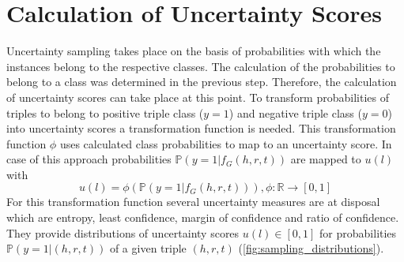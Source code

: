\section{Calculation of Uncertainty Scores}
\label{sec:calculation_of_uncertainty_scores}
%
Uncertainty sampling takes place on the basis of probabilities with which the instances belong to the respective classes.
The calculation of the probabilities to belong to a class was determined in the previous step.
Therefore, the calculation of uncertainty scores can take place at this point.
%
To transform probabilities of triples to belong to positive triple class ($y = 1$) and negative triple class ($y = 0$) into uncertainty scores a transformation function is needed.
This transformation function $\phi$ uses calculated class probabilities to map to an uncertainty score.
In case of this approach probabilities $\mathds{P}(y = 1| f_G(h, r, t))$ are  mapped to $u(l)$ with 
\begin{equation} \label{eqn:uncertainty_function}
    u(l) = \phi(\mathds{P}(y = 1| f_G(h, r, t))), \phi: \mathbb{R} \rightarrow [0,1]
\end{equation}
For this transformation function several uncertainty measures are at disposal which are entropy, least confidence, margin of confidence and ratio of confidence.
They provide distributions of uncertainty scores $u(l) \in [0, 1]$ for probabilities $\mathbb{P}(y = 1 | (h,r,t))$ of a given triple $(h, r, t)$ (\autoref{fig:sampling_distributions}).
